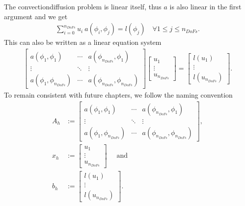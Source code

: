\documentclass[letterpaper,10pt,english, openany]{sphinxmanual}
\begin{document}
The convection\sphinxhyphen{}diffusion problem is linear itself, thus \(a\) is also linear in the first argument and we get
\begin{equation*}
\begin{split}\sum_{i= 0}^{n_{DoFs}} u_i\ a\left(\phi_i,\phi_j \right) = l\left(\phi_j \right) \quad \forall 1 \leq j \leq n_{DoFs}.\end{split}
\end{equation*}
This can also be written as a linear equation system
\begin{equation*}
\begin{split}\begin{bmatrix}
  a\left(\phi_1,\phi_1 \right) & \cdots & a\left(\phi_{n_{DoFs}},\phi_1 \right) \\
  \vdots & \ddots & \vdots \\
  a\left(\phi_1,\phi_{n_{DoFs}} \right) & \cdots & a\left(\phi_{n_{DoFs}},\phi_{n_{DoFs}} \right)
\end{bmatrix}
\begin{bmatrix}
  u_1\\
  \vdots\\
  u_{n_{DoFs}}
\end{bmatrix}
=
\begin{bmatrix}
  l(u_1)\\
  \vdots\\
  l(u_{n_{DoFs}})
\end{bmatrix}.\end{split}
\end{equation*}
To remain consistent with future chapters, we follow the naming convention
\begin{equation*}
\begin{split}A_h &:= \begin{bmatrix}
  a\left(\phi_1,\phi_1 \right) & \cdots & a\left(\phi_{n_{DoFs}},\phi_1 \right) \\
  \vdots & \ddots & \vdots \\
  a\left(\phi_1,\phi_{n_{DoFs}} \right) & \cdots & a\left(\phi_{n_{DoFs}},\phi_{n_{DoFs}} \right)
\end{bmatrix}, \\
x_h &:= \begin{bmatrix}
  u_1\\
  \vdots\\
  u_{n_{DoFs}}
\end{bmatrix}  \quad \text{ and } \\
b_h &:= \begin{bmatrix}
  l(u_1)\\
  \vdots\\
  l(u_{n_{DoFs}})
\end{bmatrix}.\end{split}
\end{equation*}
\end{document}
